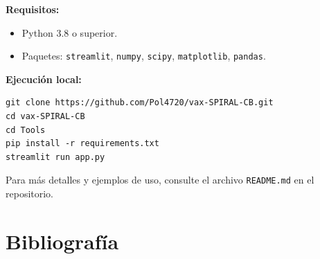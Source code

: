 \documentclass[12pt,a4paper]{article}
\begin{document}
\textbf{Requisitos:}
\begin{itemize}
    \item Python 3.8 o superior.
    \item Paquetes: \texttt{streamlit}, \texttt{numpy}, \texttt{scipy}, \texttt{matplotlib}, \texttt{pandas}.
\end{itemize}

\textbf{Ejecución local:}
\begin{verbatim}
git clone https://github.com/Pol4720/vax-SPIRAL-CB.git
cd vax-SPIRAL-CB
cd Tools
pip install -r requirements.txt
streamlit run app.py
\end{verbatim}

Para más detalles y ejemplos de uso, consulte el archivo \texttt{README.md} en el repositorio.
\section{Bibliografía}
\end{document}
